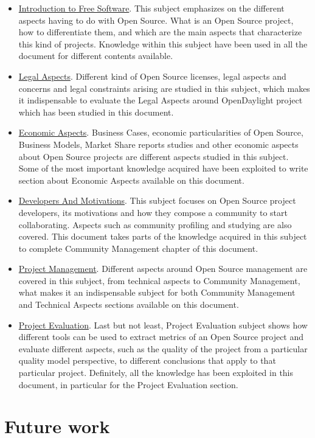 \documentclass[a4paper, 12pt]{book}
\begin{document}
\begin{itemize}
 \item{\underline{Introduction to Free Software}}. This subject emphasizes on the different aspects having to do with Open Source. What is an Open Source project, how to differentiate them, and which are the main aspects that characterize this kind of projects. Knowledge within this subject have been used in all the document for different contents available.
 \item{\underline{Legal Aspects}}. Different kind of Open Source licenses, legal aspects and concerns and legal constraints arising are studied in this subject, which makes it indispensable to evaluate the Legal Aspects around OpenDaylight project which has been studied in this document.
 \item{\underline{Economic Aspects}}. Business Cases, economic particularities of Open Source, Business Models, Market Share reports studies and other economic aspects about Open Source projects are different aspects studied in this subject. Some of the most important knowledge acquired have been exploited to write section about Economic Aspects available on this document.
 \item{\underline{Developers And Motivations}}. This subject focuses on Open Source project developers, its motivations and how they compose a community to start collaborating. Aspects such as community profiling and studying are also covered. This document takes parts of the knowledge acquired in this subject to complete Community Management chapter of this document.
 \item{\underline{Project Management}}. Different aspects around Open Source management are covered in this subject, from technical aspects to Community Management, what makes it an indispensable subject for both Community Management and Technical Aspects sections available on this document.
 \item{\underline{Project Evaluation}}. Last but not least, Project Evaluation subject shows how different tools can be used to extract metrics of an Open Source project and evaluate different aspects, such as the quality of the project from a particular quality model perspective, to different conclusions that apply to that particular project. Definitely, all the knowledge has been exploited in this document, in particular for the Project Evaluation section.
\end{itemize}

\section{Future work}
\label{sec:future}
\end{document}

